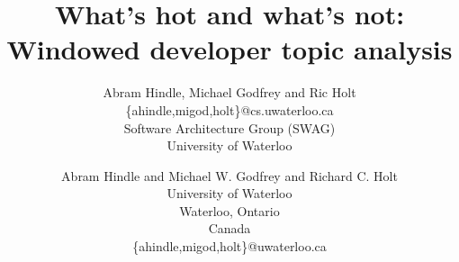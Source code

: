 \documentclass[times, 10pt,twocolumn]{article}
\author{Abram Hindle, Michael Godfrey and Ric Holt \\
\{ahindle,migod,holt\}@cs.uwaterloo.ca\\
Software Architecture Group (SWAG)\\
University of Waterloo\\
}
\title{What's hot and what's not:\\Windowed developer topic analysis}
\begin{document}
\newcommand{\affaddr}[1]{#1}
\newcommand{\aemail}[1]{#1}
\author{
Abram Hindle and Michael W. Godfrey and Richard C. Holt\\
\affaddr{University of Waterloo}\\
\affaddr{Waterloo, Ontario}\\
\affaddr{Canada}\\
\aemail{\{ahindle,migod,holt\}@uwaterloo.ca}
}






\maketitle
\thispagestyle{empty}
\end{document}
